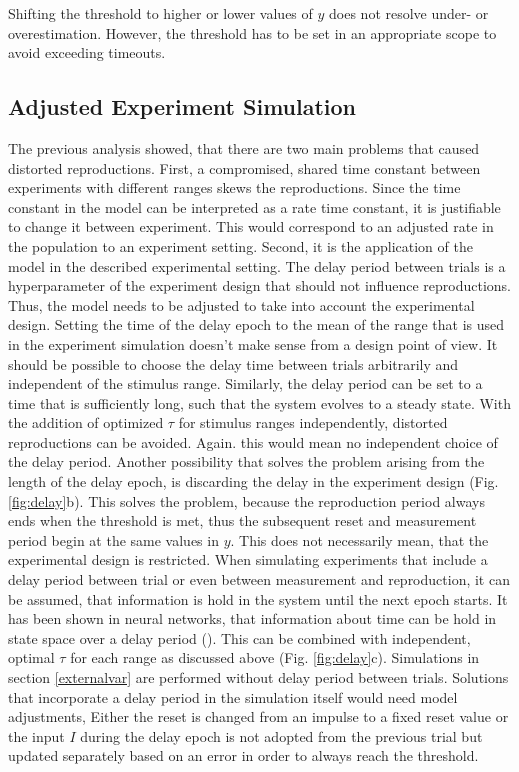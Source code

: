 \documentclass[10pt]{article}
\begin{document}
Shifting the threshold to higher or lower values of $y$ does not resolve under- or overestimation. However, the threshold has to be set in an appropriate scope to avoid exceeding timeouts. 


\subsection{Adjusted Experiment Simulation}
The previous analysis showed, that there are two main problems that caused distorted reproductions. 
First, a compromised, shared time constant between experiments with different ranges skews the reproductions.
Since the time constant in the model can be interpreted as a rate time constant, it is justifiable to change it between experiment. 
This would correspond to an adjusted rate in the population to an experiment setting.
Second, it is the application of the model in the described experimental setting. The delay period between trials is a hyperparameter of the experiment design that should not influence reproductions.
Thus, the model needs to be adjusted to take into account the experimental design. 
Setting the time of the delay epoch to the mean of the range that is used in the experiment simulation doesn't make sense from a design point of view. It should be possible to choose the delay time between trials arbitrarily and independent of the stimulus range. 
Similarly, the delay period can be set to a time that is sufficiently long, such that the system evolves to a steady state. With the addition of optimized $\tau$ for stimulus ranges independently, distorted reproductions can be avoided. Again. this would mean no independent choice of the delay period.
Another possibility that solves the problem arising from the length of the delay epoch, is discarding the delay in the experiment design (Fig. \ref{fig:delay}b).
This solves the problem, because the reproduction period always ends when the threshold is met, thus the subsequent reset and measurement period begin at the same values in $y$.  
This does not necessarily mean, that the experimental design is restricted. When simulating experiments that include a delay period between trial or even between measurement and reproduction, it can be assumed, that information is hold in the system until the next epoch starts. 
It has been shown in neural networks, that information about time can be hold in state space over a delay period (\cite{Bi2020}).
This can be combined with independent, optimal $\tau$ for each range as discussed above (Fig. \ref{fig:delay}c).
Simulations in section \ref{externalvar} are performed without delay period between trials.
Solutions that incorporate a delay period in the simulation itself would need model adjustments,
Either the reset is changed from an impulse to a fixed reset value or the input $I$ during the delay epoch is not adopted from the previous trial but updated separately based on an error in order to always reach the threshold. 
\end{document}
